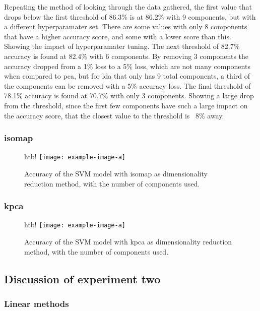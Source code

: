 Repeating the method of looking through the data gathered, the first value that drops below the first threshold of 86.3\% is at 86.2\% with 9 components, but with a different hyperparamater set. There are some values with only 8 components that have a higher accuracy score, and some with a lower score than this. Showing the impact of hyperparamater tuning.
The next threshold of 82.7\% accuracy is found at 82.4\% with 6 components. By removing 3 components the accuracy dropped from a 1\% loss to a 5\% loss, which are not many components when compared to \gls{pca}, but for \gls{lda} that only has 9 total components, a third of the components can be removed with a 5\% accuracy loss.
The final threshold of 78.1\% accuracy is found at 70.7\% with only 3 components. Showing a large drop from the threshold, since the first few components have such a large impact on the accuracy score, that the closest value to the threshold is ~8\% away.



\subsubsection{\gls{isomap}}\label{subsubsec:experiment_2_isomap}

\begin{figure}{htb!}
    \centering
    \texttt{[image: example-image-a]}
    \caption{Accuracy of the SVM model with \gls{isomap} as dimensionality reduction method, with the number of components used.}
    \label{fig:experiment_2_isomap_svm}
\end{figure}


\subsubsection{\gls{kpca}}\label{subsubsec:experiment_2_kpca}

\begin{figure}{htb!}
    \centering
    \texttt{[image: example-image-a]}
    \caption{Accuracy of the SVM model with \gls{kpca} as dimensionality reduction method, with the number of components used.}
    \label{fig:experiment_2_kpca_svm}
\end{figure}


\subsection{Discussion of experiment two}\label{subsec:experiment_2_discussion}

\subsubsection{Linear methods}


